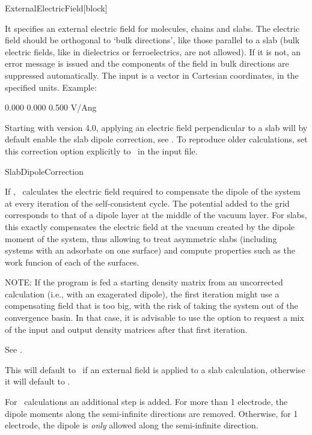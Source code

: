 \begin{fdfentry}{ExternalElectricField}[block]
  
  It specifies an external electric field for molecules, chains and
  slabs.  The electric field should be orthogonal to `bulk
  directions', like those parallel to a slab (bulk electric fields,
  like in dielectrics or ferroelectrics, are not allowed). If it is
  not, an error message is issued and the components of the field in
  bulk directions are suppressed automatically. The input is a vector
  in Cartesian coordinates, in the specified units. Example:
  \begin{fdfexample}
        0.000  0.000  0.500  V/Ang
  \end{fdfexample}

  Starting with version 4.0, applying an electric field perpendicular
  to a slab will by default enable the slab dipole correction, see
  . To reproduce older calculations, set
  this correction option explicitly to \fdffalse\ in the input file.

\end{fdfentry}

\begin{fdflogicalF}{SlabDipoleCorrection}
  
  If \fdftrue, \siesta\ calculates the electric field required to
  compensate the dipole of the system at every iteration of the
  self-consistent cycle. The potential added to the grid corresponds
  to that of a dipole layer at the middle of the vacuum layer. For
  slabs, this exactly compensates the electric field at the vacuum
  created by the dipole moment of the system, thus allowing to treat
  asymmetric slabs (including systems with an adsorbate on one
  surface) and compute properties such as the work funcion of each of
  the surfaces.

  NOTE: If the program is fed a starting density matrix from an
  uncorrected calculation (i.e., with an exagerated dipole), the first
  iteration might use a compensating field that is too big, with the
  risk of taking the system out of the convergence basin. In that
  case, it is advisable to use the
   option to request a mix of the input and
  output density matrices after that first iteration.

  See .

  This will default to \fdftrue\ if an external field is applied to a
  slab calculation, otherwise it will default to \fdffalse.

  For \tsiesta\ calculations an additional step is added. For more
  than 1 electrode, the dipole moments along the semi-infinite
  directions are removed. Otherwise, for 1 electrode, the dipole is
  \emph{only} allowed along the semi-infinite direction.

\end{fdflogicalF}



